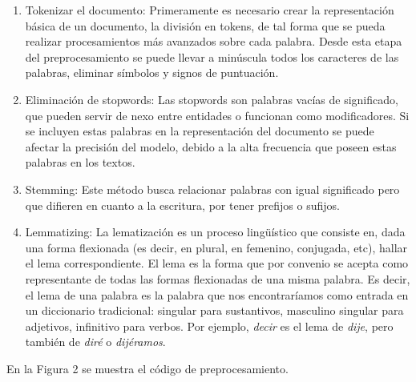 \documentclass[a4paper,10pt,twocolumn]{article}
\begin{document}
        \begin{enumerate}
                \item Tokenizar el documento: Primeramente es necesario crear la representación básica de un documento, la división en tokens, de tal forma que se pueda realizar procesamientos más avanzados sobre cada palabra. Desde esta etapa del preprocesamiento se puede llevar a minúscula todos los caracteres de las palabras, eliminar símbolos y signos de puntuación.
                
                \item Eliminación de stopwords: Las stopwords son palabras vacías de significado, que pueden servir de nexo entre entidades o funcionan como modificadores. Si se incluyen estas palabras en la representación del documento se puede afectar la precisión del modelo, debido a la alta frecuencia que poseen estas palabras en los textos.

                \item Stemming: Este método busca relacionar palabras con igual significado pero que difieren en cuanto a la escritura, por tener prefijos o sufijos. 

                \item Lemmatizing: La lematización es un proceso lingüístico que consiste en, dada una forma flexionada (es decir, en plural, en femenino, conjugada, etc), hallar el lema correspondiente. El lema es la forma que por convenio se acepta como representante de todas las formas flexionadas de una misma palabra. Es decir, el lema de una palabra es la palabra que nos encontraríamos como entrada en un diccionario tradicional: singular para sustantivos, masculino singular para adjetivos, infinitivo para verbos. Por ejemplo, \emph{decir} es el lema de \emph{dije}, pero también de \emph{diré} o \emph{dijéramos}.
                
    	\end{enumerate}


        En la Figura 2 se muestra el código de preprocesamiento.

\end{document}
